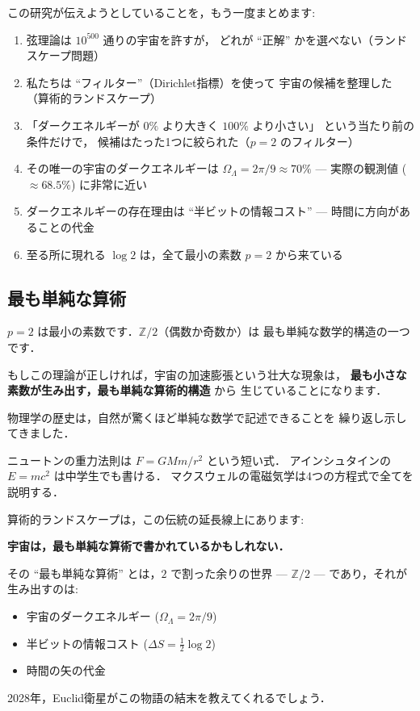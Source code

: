 \documentclass[11pt,a4paper]{article}
\begin{document}
この研究が伝えようとしていることを，もう一度まとめます:

\begin{enumerate}
\item 弦理論は $10^{500}$ 通りの宇宙を許すが，
どれが ``正解'' かを選べない（ランドスケープ問題）

\item 私たちは ``フィルター''（Dirichlet指標）を使って
宇宙の候補を整理した（算術的ランドスケープ）

\item 「ダークエネルギーが $0\%$ より大きく $100\%$ より小さい」
という当たり前の条件だけで，
候補はたった1つに絞られた（$p=2$ のフィルター）

\item その唯一の宇宙のダークエネルギーは $\Omega_\Lambda = 2\pi/9 \approx 70\%$
--- 実際の観測値 ($\approx 68.5\%$) に非常に近い

\item ダークエネルギーの存在理由は ``半ビットの情報コスト''
--- 時間に方向があることの代金

\item 至る所に現れる $\log 2$ は，全て最小の素数 $p=2$ から来ている
\end{enumerate}

\subsection{最も単純な算術}

$p=2$ は最小の素数です．$\mathbb{Z}/2$（偶数か奇数か）は
最も単純な数学的構造の一つです．

もしこの理論が正しければ，宇宙の加速膨張という壮大な現象は，
\textbf{最も小さな素数が生み出す，最も単純な算術的構造} から
生じていることになります．

\begin{tcolorbox}[colback=green!5,colframe=green!50!black,title=メッセージ]
物理学の歴史は，自然が驚くほど単純な数学で記述できることを
繰り返し示してきました．

ニュートンの重力法則は $F = GMm/r^2$ という短い式．
アインシュタインの $E = mc^2$ は中学生でも書ける．
マクスウェルの電磁気学は4つの方程式で全てを説明する．

算術的ランドスケープは，この伝統の延長線上にあります:

\begin{center}
\large
\textbf{宇宙は，最も単純な算術で書かれているかもしれない．}
\end{center}

その ``最も単純な算術'' とは，$2$ で割った余りの世界 --- $\mathbb{Z}/2$ ---
であり，それが生み出すのは:
\begin{itemize}
\item 宇宙のダークエネルギー ($\Omega_\Lambda = 2\pi/9$)
\item 半ビットの情報コスト ($\Delta S = \frac{1}{2}\log 2$)
\item 時間の矢の代金
\end{itemize}

2028年，Euclid衛星がこの物語の結末を教えてくれるでしょう．
\end{tcolorbox}
\end{document}
